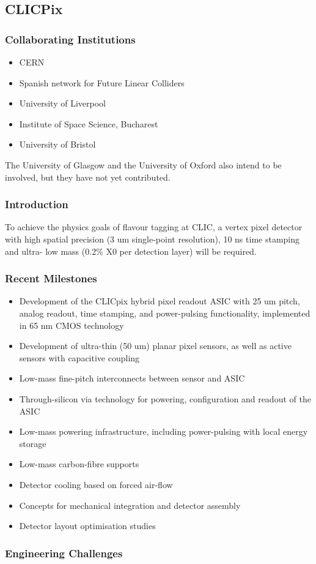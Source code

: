 \subsection{CLICPix}
\subsubsection{Collaborating Institutions}
\begin{itemize}
    \item CERN
    \item Spanish network for Future Linear Colliders
    \item University of Liverpool
    \item Institute of Space Science, Bucharest
    \item University of Bristol
\end{itemize}
The University of Glasgow and the University of Oxford also intend to be involved, but they have not yet contributed.

\subsubsection{Introduction}
To achieve the physics goals of flavour tagging at CLIC, a vertex pixel detector with high spatial precision (3 um single-point resolution), 10 ns time stamping and ultra- low mass (0.2\% X0 per detection layer) will be required.

\subsubsection{Recent Milestones}
\begin{itemize}
\item Development of the CLICpix hybrid pixel readout ASIC with 25 um pitch, analog readout, time stamping, and power-pulsing functionality, implemented in 65 nm CMOS technology
\item Development of ultra-thin (50 um) planar pixel sensors, as well as active sensors with capacitive coupling
\item Low-mass fine-pitch interconnects between sensor and ASIC
\item Through-silicon via technology for powering, configuration and readout of the ASIC
\item Low-mass powering infrastructure, including power-pulsing with local energy storage
\item Low-mass carbon-fibre supports
\item Detector cooling based on forced air-flow
\item Concepts for mechanical integration and detector assembly
\item Detector layout optimisation studies
\end{itemize}

\subsubsection{Engineering Challenges}
